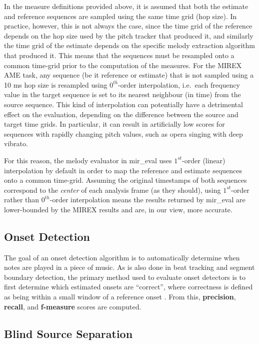 \documentclass{article}
\begin{document}
In the measure definitions provided above, it is assumed that both the estimate
and reference sequences are sampled using the same time grid (hop size). In
practice, however, this is not always the case, since the time grid of the
reference depends on the hop size used by the pitch tracker that produced
it, and similarly the time grid of the estimate depends on the specific melody
extraction algorithm that produced it. This means that the sequences must be
resampled onto a common time-grid prior to the computation of the measures. For
the MIREX AME task, any sequence (be it reference or estimate) that is not
sampled using a 10 ms hop size is resampled using $0^{th}$-order interpolation,
i.e.~each frequency value in the target sequence is set to its nearest
neighbour (in time) from the source sequence. This kind of interpolation can
potentially have a detrimental effect on the evaluation, depending on the
difference between the source and target time grids. In particular, it can
result in artificially low scores for sequences with rapidly changing pitch
values, such as opera singing with deep vibrato. 

For this reason, the melody evaluator in mir\_eval uses $1^{st}$-order (linear)
interpolation by default in order to map the reference and estimate sequences
onto a common time-grid. Assuming the original timestamps of both sequences
correspond to the \textit{center} of each analysis frame (as they should),
using $1^{st}$-order rather than $0^{th}$-order interpolation means the results
returned by mir\_eval are lower-bounded by the MIREX results and are, in our
view, more accurate.

\subsection{Onset Detection}

The goal of an onset detection algorithm is to automatically determine when notes are played in a piece of music.  As is also done in beat tracking and segment boundary detection, the primary method used to evaluate onset detectors is to first determine which estimated onsets are ``correct'', where correctness is defined as being within a small window of a reference onset \cite{bock2012evaluating}.  From this, \textbf{precision}, \textbf{recall}, and \textbf{f-measure} scores are computed.  

\subsection{Blind Source Separation}
\end{document}
